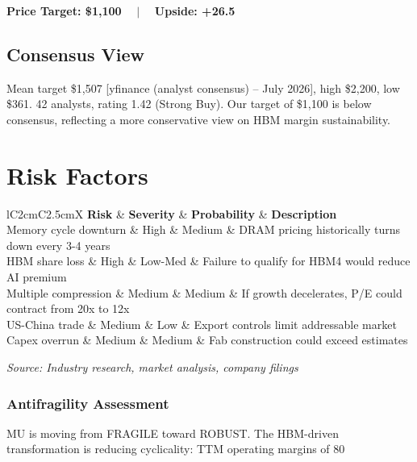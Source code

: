 \documentclass[11pt,a4paper]{report}
\newcommand{\highlightbox}[2][gslightblue]{%
  \begin{center}
    \colorbox{#1}{\begin{minipage}{0.92\textwidth}\vspace{8pt}#2\vspace{8pt}\end{minipage}}
  \end{center}
}
\newcommand{\source}[1]{\hfill\small\textit{#1}}
\begin{document}
\highlightbox{%
\textbf{Price Target: \$1,100} ~~$\vert$~~ \textbf{Upside: +26.5%
}

\section{Consensus View}
Mean target \$1,507 [yfinance (analyst consensus) -- July 2026], high \$2,200, low \$361. 42 analysts, rating 1.42 (Strong Buy). Our target of \$1,100 is below consensus, reflecting a more conservative view on HBM margin sustainability.

\chapter{Risk Factors}

\begin{table}[H]
\centering
\caption{Risk Assessment Matrix}
\begin{tabularx}{\textwidth}{lC{2cm}C{2.5cm}X}
\toprule
\textbf{Risk} & \textbf{Severity} & \textbf{Probability} & \textbf{Description} \\
\midrule
Memory cycle downturn & High & Medium & DRAM pricing historically turns down every 3-4 years \\
HBM share loss & High & Low-Med & Failure to qualify for HBM4 would reduce AI premium \\
Multiple compression & Medium & Medium & If growth decelerates, P/E could contract from 20x to 12x \\
US-China trade & Medium & Low & Export controls limit addressable market \\
Capex overrun & Medium & Medium & Fab construction could exceed estimates
\bottomrule
\end{tabularx}
\source{Source: Industry research, market analysis, company filings}
\end{table}

\subsection*{Antifragility Assessment}
MU is moving from FRAGILE toward ROBUST. The HBM-driven transformation is reducing cyclicality: TTM operating margins of 80%

}
\end{document}
